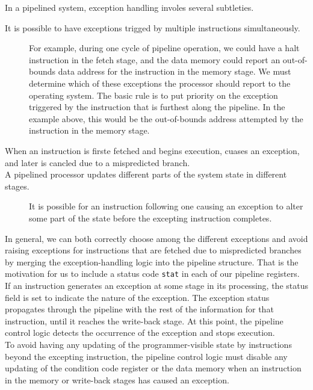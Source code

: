 \documentclass[11pt]{article}
\begin{document}
In a pipelined system, exception handling involes several subtleties.\\
\begin{description}
\item[{It is possible to have exceptions trigged by multiple instructions simultaneously.}] For example, during one cycle of pipeline operation, we could have a halt instruction in the fetch stage, and the data memory could report an out-of-bounds data address for the instruction in the memory stage. We must determine which of these exceptions the processor should report to the operating system. The basic rule is to put priority on the exception triggered by the instruction that is furthest along the pipeline. In the example above, this would be the out-of-bounds address attempted by the instruction in the memory stage.\\
\item[{When an instruction is firste fetched and begins execution, cuases an exception, and later is cancled due to a mispredicted branch.}] 

\item[{A pipelined processor updates different parts of the system state in different stages.}] It is possible for an instruction following one causing an exception to alter some part of the state before the excepting instruction completes.\\
\end{description}


In general, we can both correctly choose among the different exceptions and avoid raising exceptions for instructions that are fetched due to mispredicted branches by merging the exception-handling logic into the pipeline structure. That is the motivation for us to include a status code \texttt{stat} in each of our pipeline registers.\\

If an instruction generates an exception at some stage in its processing, the status field is set to indicate the nature of the exception. The exception status propagates through the pipeline with the rest of the information for that instruction, until it reaches the write-back stage. At this point, the pipeline control logic detects the occurrence of the exception and stops execution.\\

To avoid having any updating of the programmer-visible state by instructions beyond the excepting instruction, the pipeline control logic must disable any updating of the condition code register or the data memory when an instruction in the memory or write-back stages has caused an exception.\\
\end{document}
